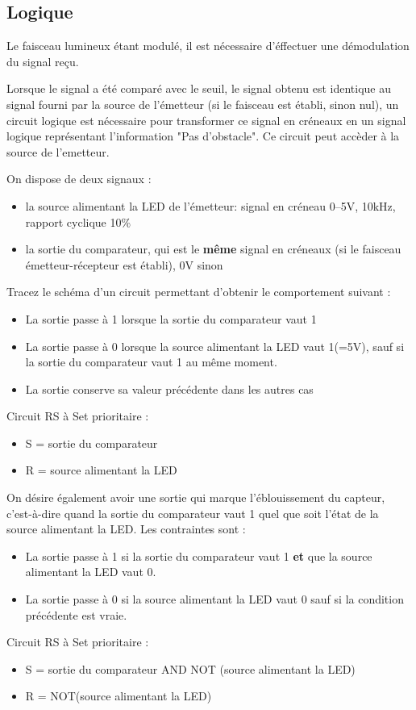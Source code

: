 \documentclass{../template/tp}
\begin{document}
\subsection{Logique}
Le faisceau lumineux étant modulé, il est nécessaire d'éffectuer une démodulation du signal reçu. 

Lorsque le signal a été comparé avec le seuil, le signal obtenu est identique au signal fourni par la source de l'émetteur (si le faisceau est établi, sinon nul), un circuit logique est nécessaire pour transformer ce signal en créneaux en un signal logique représentant l'information "Pas d'obstacle". Ce circuit peut accèder à la source de l'emetteur.

On dispose de deux signaux :

\begin{itemize}
\item la source alimentant la LED de l'émetteur: signal en créneau 0--5V, 10kHz, rapport cyclique 10\%
\item la sortie du comparateur, qui est le \textbf{même} signal en créneaux (si le faisceau émetteur-récepteur est établi), 0V sinon
\end{itemize}

\Question
{
Tracez le schéma d'un circuit permettant d'obtenir le comportement suivant :

\begin{itemize}
\item La sortie passe à 1 lorsque la sortie du comparateur vaut 1
\item La sortie passe à 0 lorsque la source alimentant la LED vaut 1(=5V), sauf si la sortie du comparateur vaut 1 au même moment.
\item La sortie conserve sa valeur précédente dans les autres cas
\end{itemize}

}
{%
Circuit RS à Set prioritaire :
\begin{itemize}
\item S = sortie du comparateur
\item R = source alimentant la LED
\end{itemize}
}


 \Question
 {
 On désire également avoir une sortie qui marque l'éblouissement du capteur, c'est-à-dire quand la sortie du comparateur vaut 1 quel que soit l'état de la source alimentant la LED. Les contraintes sont :
 \begin{itemize}
 \item La sortie passe à 1 si la sortie du comparateur vaut 1 \textbf{et} que la source alimentant la LED vaut 0.
 \item La sortie passe à 0 si la source alimentant la LED vaut 0 sauf si la condition précédente est vraie.
 \end{itemize}

 }
 {%
 Circuit RS à Set prioritaire :
 \begin{itemize}
 \item  S = sortie du comparateur AND NOT  (source alimentant la LED)
 \item  R = NOT(source alimentant la LED)
 \end{itemize}
 }
\end{document}
